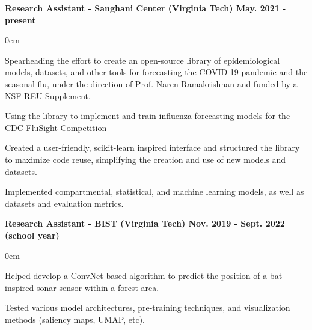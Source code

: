 \documentclass{article}
\begin{document}
\begin{center}
\begin{flushleft}
    \textbf{Research Assistant - Sanghani Center (Virginia Tech) \hfill May. 2021 - present}
    \begin{compactitem}
      \itemsep0em
      \item Spearheading the effort to create an open-source library of epidemiological models, datasets, and other tools for forecasting the COVID-19 pandemic and the seasonal flu, under the direction of Prof. Naren Ramakrishnan and funded by a NSF REU Supplement.
      \item Using the library to implement and train influenza-forecasting models for the CDC FluSight Competition
      \item Created a user-friendly, scikit-learn inspired interface and structured the library to maximize code reuse, simplifying the creation and use of new models and datasets.
      \item Implemented compartmental, statistical, and machine learning models, as well as datasets and evaluation metrics.
    \end{compactitem}

    \textbf{Research Assistant - BIST (Virginia Tech) \hfill Nov. 2019 - Sept. 2022 (school year)}
    \begin{compactitem}
      \itemsep0em
      \item Helped develop a ConvNet-based algorithm to predict the position of a bat-inspired sonar sensor within a forest area.
      \item Tested various model architectures, pre-training techniques, and visualization methods (saliency maps, UMAP, etc).
    \end{compactitem}


\end{flushleft}
\end{center}
\end{document}
